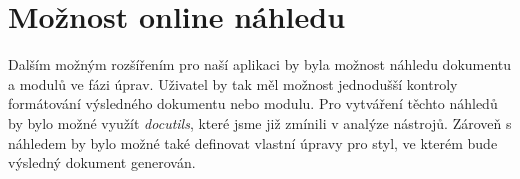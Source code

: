 \section{Možnost online náhledu}

Dalším možným rozšířením pro naší aplikaci by byla možnost náhledu dokumentu a modulů ve fázi úprav. Uživatel by tak měl možnost
jednodušší kontroly formátování výsledného dokumentu nebo modulu. Pro vytváření těchto náhledů by bylo možné využít \textit{docutils},
které jsme již zmínili v analýze nástrojů. Zároveň s náhledem by bylo možné také definovat vlastní úpravy pro styl, ve kterém
bude výsledný dokument generován.